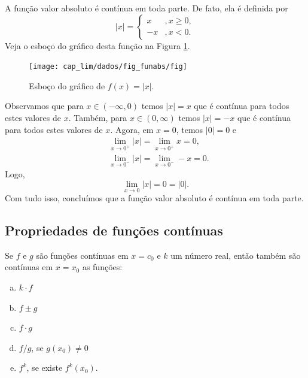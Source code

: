 \begin{ex}\label{ex:lim_fabs_cont}
  A função valor absoluto é contínua em toda parte. De fato, ela é definida por
  \begin{equation}
    |x| = \left\{
      \begin{array}{ll}
        x &, x\geq 0,\\
        -x &, x<0.
      \end{array}
    \right.
  \end{equation}
  Veja o esboço do gráfico desta função na Figura \ref{fig:funabs}.

  \begin{figure}[H]
    \centering
    \texttt{[image: cap\_lim/dados/fig\_funabs/fig]}
    \caption{Esboço do gráfico de $f(x) = |x|$.}
    \label{fig:funabs}
  \end{figure}
  
  Observamos que para $x\in(-\infty, 0)$ temos $|x| = x$ que é contínua para todos estes valores de $x$. Também, para $x\in(0,\infty)$ temos $|x|=-x$ que é contínua para todos estes valores de $x$. Agora, em $x=0$, temos $|0|=0$ e
  \begin{align}
    & \lim_{x\to 0^+} |x| = \lim_{x\to 0^+} x = 0, \\
    & \lim_{x\to 0^-} |x| = \lim_{x\to 0^-} -x = 0.
  \end{align}
  Logo,
  \begin{equation}
    \lim_{x\to 0} |x| = 0 = |0|.
  \end{equation}
  Com tudo isso, concluímos que a função valor absoluto é contínua em toda parte.
\end{ex}

\subsection{Propriedades de funções contínuas}

Se $f$ e $g$ são funções contínuas em $x=c_0$ e $k$ um número real, então também são contínuas em $x=x_0$ as funções:
\begin{enumerate}[a)]
\item $k\cdot f$
\item $f\pm g$
\item $f\cdot g$
\item $f/g$, se $g(x_0)\neq 0$
\item $f^k$, se existe $f^k(x_0)$.
\end{enumerate}


